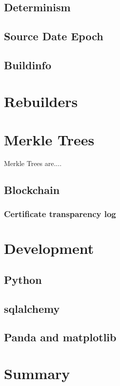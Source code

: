 \documentclass[../Main/thesis.tex]{subfiles}
\begin{document}
    \subsection*{Determinism}
    \subsection*{Source Date Epoch}
    \subsection*{Buildinfo}

\section{Rebuilders}\label{sec:rebuilders} 

\section{Merkle Trees}
Merkle Trees are....

    \subsection*{Blockchain}

    \subsubsection*{Certificate transparency log}


\section{Development}\label{sec:development} 
    \subsection*{Python}
    \subsection*{sqlalchemy}
    \subsection*{Panda and matplotlib}

\section{Summary}\label{sec:summary-theory} 

\blankpage
\end{document}
